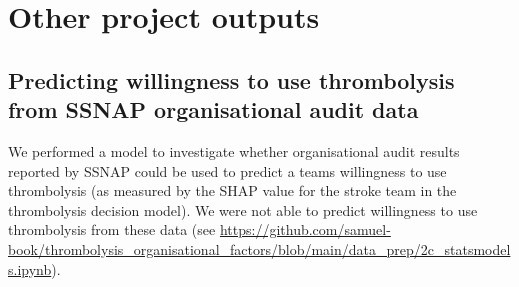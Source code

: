 \section{Other project outputs}

\subsection{Predicting willingness to use thrombolysis from SSNAP organisational audit data}

We performed a model to investigate whether organisational audit results reported by SSNAP could be used to predict a teams willingness to use thrombolysis (as measured by the SHAP value for the stroke team in the thrombolysis decision model). We were not able to predict willingness to use thrombolysis from these data (see \url{https://github.com/samuel-book/thrombolysis_organisational_factors/blob/main/data_prep/2c_statsmodels.ipynb}).



